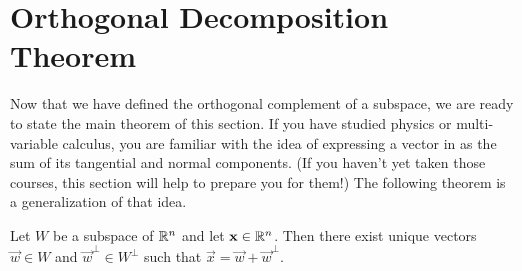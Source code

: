 \documentclass{ximera}
\begin{document}
\section*{Orthogonal Decomposition Theorem}

Now that we have defined the orthogonal complement of a subspace, we are ready to state the main theorem of this section.  If you have studied physics or multi-variable calculus, you are familiar with the idea of expressing a vector in as the sum of its tangential and normal components. (If you haven't yet taken those courses, this section will help to prepare you for them!)  The following theorem is a generalization of that idea.

\begin{theorem}\label{th:OrthoDecomp}
Let $W$ be a subspace of $\mathbb{R}^n$ and let $\mathbf{x} \in \mathbb{R}^n$.  Then there exist unique vectors $\vec{w} \in W$ and $\vec{w}^\perp \in W^\perp$ such that $\vec{x} = \vec{w} + \vec{w}^\perp$.
\end{theorem}
\end{document}

